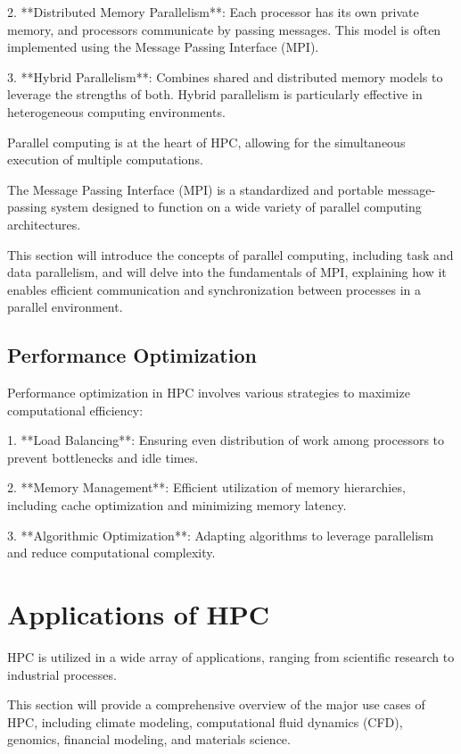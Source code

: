 2. **Distributed Memory Parallelism**: Each processor has its own private memory, and processors communicate by passing messages. This model is often implemented using the Message Passing Interface (MPI).

3. **Hybrid Parallelism**: Combines shared and distributed memory models to leverage the strengths of both. Hybrid parallelism is particularly effective in heterogeneous computing environments.

Parallel computing is at the heart of HPC, allowing for the simultaneous execution of multiple computations. 

The Message Passing Interface (MPI) is a standardized and portable message-passing system designed to function on a wide variety of parallel computing architectures. 

This section will introduce the concepts of parallel computing, including task and data parallelism, and will delve into the fundamentals of MPI, explaining how it enables efficient communication and synchronization between processes in a parallel environment.

\subsection{Performance Optimization}

Performance optimization in HPC involves various strategies to maximize computational efficiency:

1. **Load Balancing**: Ensuring even distribution of work among processors to prevent bottlenecks and idle times.
   
2. **Memory Management**: Efficient utilization of memory hierarchies, including cache optimization and minimizing memory latency.
   
3. **Algorithmic Optimization**: Adapting algorithms to leverage parallelism and reduce computational complexity.

\section{Applications of HPC}

HPC is utilized in a wide array of applications, ranging from scientific research to industrial processes. 

This section will provide a comprehensive overview of the major use cases of HPC, including climate modeling, computational fluid dynamics (CFD), genomics, financial modeling, and materials science. 

